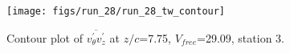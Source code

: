 \begin{figure}[H]
\centering
\texttt{[image: figs/run\_28/run\_28\_tw\_contour]}
\caption{Contour plot of $\overline{v_{\theta}^{\prime} v_{z}^{\prime}}$ at $z/c$=7.75, $V_{free}$=29.09, station 3.}
\label{fig:run_28_tw_contour}
\end{figure}



